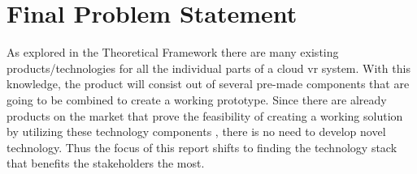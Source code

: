 \section{Final Problem Statement}

As explored in the Theoretical Framework there are many existing products/technologies for all the individual parts of a cloud \acrshort{vr} system. With this knowledge, the product will consist out of several pre-made components that are going to be combined to create a working prototype. Since there are already products on the market that prove the feasibility of creating a working solution by utilizing these technology components \parencite{zerolight5g}, there is no need to develop novel technology. Thus the focus of this report shifts to finding the technology stack that benefits the stakeholders the most.